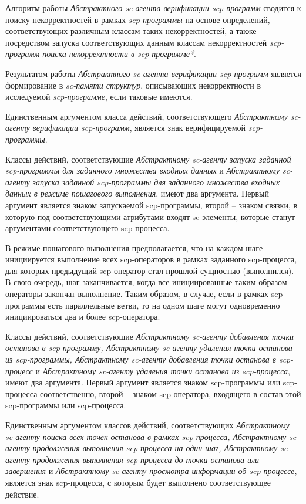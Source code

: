Алгоритм работы \textit{Абстрактного sc-агента верификации scp-программ} сводится к поиску некорректностей в рамках \textit{scp-программы} на основе определений, соответствующих различным классам таких некорректностей, а также посредством запуска соответствующих данным классам некорректностей \textit{scp-программ поиска некорректности в scp-программе*}.

Результатом работы \textit{Абстрактного sc-агента верификации scp-программ} является формирование в \textit{sc-памяти структур}, описывающих некорректности в исследуемой \textit{scp-программе}, если таковые имеются.

Единственным аргументом класса действий, соответствующего \textit{Абстрактному sc-агенту верификации scp-программ}, является знак верифицируемой \textit{scp-программы}.

Классы действий, соответствующие \textit{Абстрактному sc-агенту запуска заданной scp-программы для заданного множества входных данных} и \textit{Абстрактному sc-агенту запуска заданной scp-программы для заданного множества входных данных в режиме пошагового выполнения}, имеют два аргумента. Первый аргумент является знаком запускаемой scp-программы, второй -- знаком связки, в которую под соответствующими атрибутами входят sc-элементы, которые станут аргументами соответствующего scp-процесса.

В режиме пошагового выполнения предполагается, что на каждом шаге инициируется выполнение всех scp-операторов в рамках заданного \mbox{scp-процесса}, для которых предыдущий scp-оператор стал прошлой сущностью (выполнился). В свою очередь, шаг заканчивается, когда все инициированные таким образом операторы закончат выполнение. Таким образом, в случае, если в рамках scp-программы есть параллельные ветви, то на одном шаге могут одновременно инициироваться два и более scp-оператора.

Классы действий, соответствующие \textit{Абстрактному sc-агенту добавления точки останова в scp-программу, Абстрактному sc-агенту удаления точки останова из scp-программы, Абстрактному sc-агенту добавления точки останова в scp-процесс} и \textit{Абстрактному sc-агенту удаления точки останова из scp-процесса}, имеют два аргумента. Первый аргумент является знаком \mbox{scp-программы} или scp-процесса соответственно, второй -- знаком \mbox{scp-оператора}, входящего в состав этой scp-программы или scp-процесса.

Единственным аргументом классов действий, соответствующих \textit{Абстрактному sc-агенту поиска всех точек останова в рамках scp-процесса, Абстрактному sc-агенту продолжения выполнения scp-процесса на один шаг, Абстрактному sc-агенту продолжения выполнения scp-процесса до точки останова или завершения} и \textit{Абстрактному sc-агенту просмотра информации об scp-процессе}, является знак scp-процесса, с которым будет выполнено соответствующее действие.

